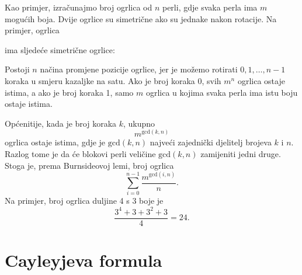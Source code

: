 Kao primjer, izračunajmo broj
ogrlica od $n$ perli,
gdje svaka perla ima $m$ mogućih boja.
Dvije ogrlice su simetrične ako su
jednake nakon rotacije.
Na primjer, ogrlica
\begin{center}
\end{center}
ima sljedeće simetrične ogrlice:
\begin{center}
\end{center}
Postoji $n$ načina promjene pozicije
ogrlice,
jer je možemo rotirati
$0,1,\ldots,n-1$ koraka u smjeru kazaljke na satu.
Ako je broj koraka 0,
svih $m^n$ ogrlica ostaje istima,
a ako je broj koraka 1,
samo $m$ ogrlica u kojima svaka
perla ima istu boju ostaje istima.

Općenitije, kada je broj koraka $k$,
ukupno
\[m^{\textrm{gcd}(k,n)}\]
ogrlica ostaje istima,
gdje je $\textrm{gcd}(k,n)$ najveći zajednički
djelitelj brojeva $k$ i $n$.
Razlog tome je da će blokovi
perli veličine $\textrm{gcd}(k,n)$
zamijeniti jedni druge.
Stoga je, prema Burnsideovoj lemi,
broj ogrlica
\[\sum_{i=0}^{n-1} \frac{m^{\textrm{gcd}(i,n)}}{n}. \]
Na primjer, broj ogrlica duljine 4
s 3 boje je
\[\frac{3^4+3+3^2+3}{4} = 24. \]

\section{Cayleyjeva formula}

